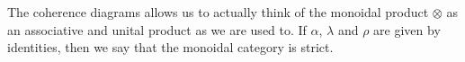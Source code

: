 \documentclass[../thesis.tex]{subfiles}
\begin{document}
\begin{definition}
\begin{center}
{\begin{tikzcd}[ampersand replacement = \&]
                    \end{tikzcd}
                }
            \end{center}
        \end{definition}

        The coherence diagrams allows us to actually think of the monoidal product $\otimes$ as an associative and unital product as we are used to. If $\alpha$, $\lambda$ and $\rho$ are given by identities, then we say that the monoidal category is strict.
\end{document}
